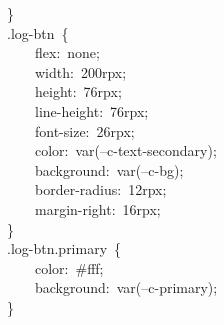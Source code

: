 \documentclass[a4paper,10pt]{article}
\begin{document}
{~~~~\}\\
~~~~.log-btn~\{\\
~~~~~~~~flex:~none;\\
~~~~~~~~width:~200rpx;\\
~~~~~~~~height:~76rpx;\\
~~~~~~~~line-height:~76rpx;\\
~~~~~~~~font-size:~26rpx;\\
~~~~~~~~color:~var(--c-text-secondary);\\
~~~~~~~~background:~var(--c-bg);\\
~~~~~~~~border-radius:~12rpx;\\
~~~~~~~~margin-right:~16rpx;\\
~~~~\}\\
~~~~.log-btn.primary~\{\\
~~~~~~~~color:~\#fff;\\
~~~~~~~~background:~var(--c-primary);\\
~~~~\}
}

\newpage
\end{document}
